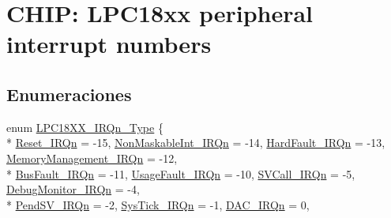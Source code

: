 \hypertarget{group___c_m_s_i_s__18_x_x___i_r_q}{}\section{C\+H\+IP\+: L\+P\+C18xx peripheral interrupt numbers}
\label{group___c_m_s_i_s__18_x_x___i_r_q}
\subsection*{Enumeraciones}
\begin{DoxyCompactItemize}
\item 
enum \hyperlink{group___c_m_s_i_s__18_x_x___i_r_q_gaa44deabd252bda567898bae35a086adc}{L\+P\+C18\+X\+X\+\_\+\+I\+R\+Qn\+\_\+\+Type} \{ \\*
\hyperlink{group___c_m_s_i_s__18_x_x___i_r_q_ggaa44deabd252bda567898bae35a086adca50ad21f2fd0d54d04b390d5a9145889a}{Reset\+\_\+\+I\+R\+Qn} = -\/15, 
\hyperlink{group___c_m_s_i_s__18_x_x___i_r_q_ggaa44deabd252bda567898bae35a086adcade177d9c70c89e084093024b932a4e30}{Non\+Maskable\+Int\+\_\+\+I\+R\+Qn} = -\/14, 
\hyperlink{group___c_m_s_i_s__18_x_x___i_r_q_ggaa44deabd252bda567898bae35a086adcab1a222a34a32f0ef5ac65e714efc1f85}{Hard\+Fault\+\_\+\+I\+R\+Qn} = -\/13, 
\hyperlink{group___c_m_s_i_s__18_x_x___i_r_q_ggaa44deabd252bda567898bae35a086adca33ff1cf7098de65d61b6354fee6cd5aa}{Memory\+Management\+\_\+\+I\+R\+Qn} = -\/12, 
\\*
\hyperlink{group___c_m_s_i_s__18_x_x___i_r_q_ggaa44deabd252bda567898bae35a086adca8693500eff174f16119e96234fee73af}{Bus\+Fault\+\_\+\+I\+R\+Qn} = -\/11, 
\hyperlink{group___c_m_s_i_s__18_x_x___i_r_q_ggaa44deabd252bda567898bae35a086adca6895237c9443601ac832efa635dd8bbf}{Usage\+Fault\+\_\+\+I\+R\+Qn} = -\/10, 
\hyperlink{group___c_m_s_i_s__18_x_x___i_r_q_ggaa44deabd252bda567898bae35a086adca4ce820b3cc6cf3a796b41aadc0cf1237}{S\+V\+Call\+\_\+\+I\+R\+Qn} = -\/5, 
\hyperlink{group___c_m_s_i_s__18_x_x___i_r_q_ggaa44deabd252bda567898bae35a086adca8e033fcef7aed98a31c60a7de206722c}{Debug\+Monitor\+\_\+\+I\+R\+Qn} = -\/4, 
\\*
\hyperlink{group___c_m_s_i_s__18_x_x___i_r_q_ggaa44deabd252bda567898bae35a086adca03c3cc89984928816d81793fc7bce4a2}{Pend\+S\+V\+\_\+\+I\+R\+Qn} = -\/2, 
\hyperlink{group___c_m_s_i_s__18_x_x___i_r_q_ggaa44deabd252bda567898bae35a086adca6dbff8f8543325f3474cbae2446776e7}{Sys\+Tick\+\_\+\+I\+R\+Qn} = -\/1, 
\hyperlink{group___c_m_s_i_s__18_x_x___i_r_q_ggaa44deabd252bda567898bae35a086adcafe396b0c790fb592adb3813c718d2dcd}{D\+A\+C\+\_\+\+I\+R\+Qn} = 0, 

\end{DoxyCompactItemize}
